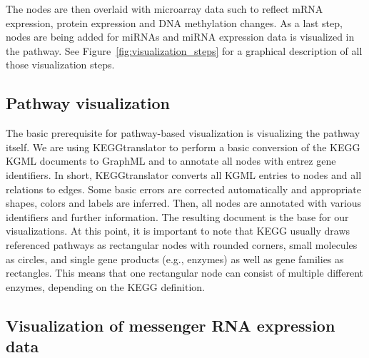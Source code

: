 \documentclass{bioinfo}
\begin{document}
The nodes are then overlaid with microarray data such to reflect mRNA expression, protein expression
and DNA methylation changes. As a last step, nodes are being added for miRNAs and miRNA expression
data is visualized in the pathway. See Figure~\ref{fig:visualization_steps} for a graphical
description of all those visualization steps.

\subsection{Pathway visualization}

The basic prerequisite for pathway-based visualization is visualizing the pathway itself. We are
using KEGGtranslator \citep[see][]{Wrzodek2011} to perform a basic conversion of the KEGG KGML
documents to GraphML and to annotate all nodes with entrez gene identifiers. In short,
KEGGtranslator converts all KGML entries to nodes and all relations to edges. Some basic errors are
corrected automatically and appropriate shapes, colors and labels are inferred. Then, all nodes are
annotated with various identifiers and further information. The resulting document is the base for
our visualizations. At this point, it is important to note that KEGG usually draws referenced
pathways as rectangular nodes with rounded corners, small molecules as circles, and single gene
products (e.g., enzymes) as well as gene families as rectangles. This means that one rectangular
node can consist of multiple different enzymes, depending on the KEGG definition.


\subsection{Visualization of messenger RNA expression data}
\end{document}
